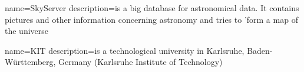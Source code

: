 

{
  name=SkyServer
  description={is a big database for astronomical data. It contains pictures
              and other information concerning astronomy and tries to 'form a 
              map of the universe
              }
}


{
  name=KIT
  description={is a technological university in Karlsruhe, Baden-Württemberg, Germany 
              (Karlsruhe Institute of Technology)
              }
}
